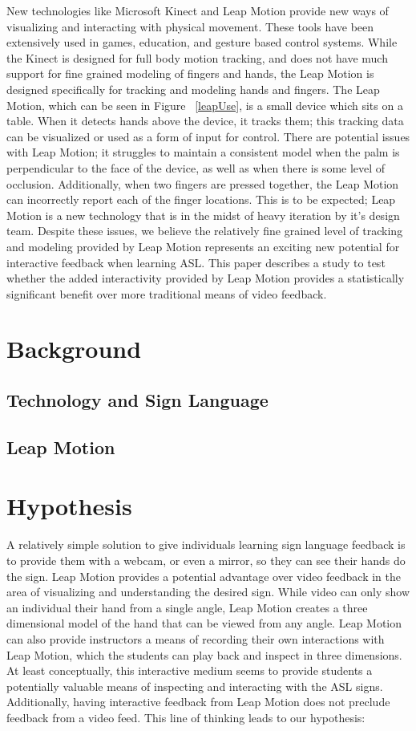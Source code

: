 \documentclass{sigchi}
\begin{document}
New technologies like Microsoft Kinect and Leap Motion provide new ways of visualizing and interacting with physical movement.  These tools have been extensively used in games, education, and gesture based control systems.  While the Kinect is designed for full body motion tracking, and does not have much support for fine grained modeling of fingers and hands, the Leap Motion is designed specifically for tracking and modeling hands and fingers.  The Leap Motion, which can be seen in Figure ~\ref{leapUse}, is a small device which sits on a table.  When it detects hands above the device, it tracks them; this tracking data can be visualized or used as a form of input for control. There are potential issues with Leap Motion; it struggles to maintain a consistent model when the palm is perpendicular to the face of the device, as well as when there is some level of occlusion.  Additionally, when two fingers are pressed together, the Leap Motion can incorrectly report each of the finger locations. This is to be expected; Leap Motion is a new technology that is in the midst of heavy iteration by it’s design team.  Despite these issues, we believe the relatively fine grained level of tracking and modeling provided by  Leap Motion represents an exciting new potential for interactive feedback when learning ASL.  This paper describes a study to test whether the added interactivity provided by Leap Motion provides a statistically significant benefit over more traditional means of video feedback.       

\section{Background}
\subsection{Technology and Sign Language}

\subsection{Leap Motion}


\section{Hypothesis}
A relatively simple solution to give individuals learning sign language feedback is to provide them with a webcam, or even a mirror, so they can see their hands do the sign.  Leap Motion provides a potential advantage over video feedback in the area of visualizing and understanding the desired sign. While video can only show an individual their hand from a single angle, Leap Motion creates a three dimensional model of the hand that can be viewed from any angle.  Leap Motion can also provide instructors a means of recording their own interactions with Leap Motion, which the students can play back and inspect in three dimensions.  At least conceptually, this interactive medium seems to provide students a potentially valuable means of inspecting and interacting with the ASL signs.  Additionally, having interactive feedback from Leap Motion does not preclude feedback from a video feed.  This line of thinking leads to our hypothesis: 
\end{document}

